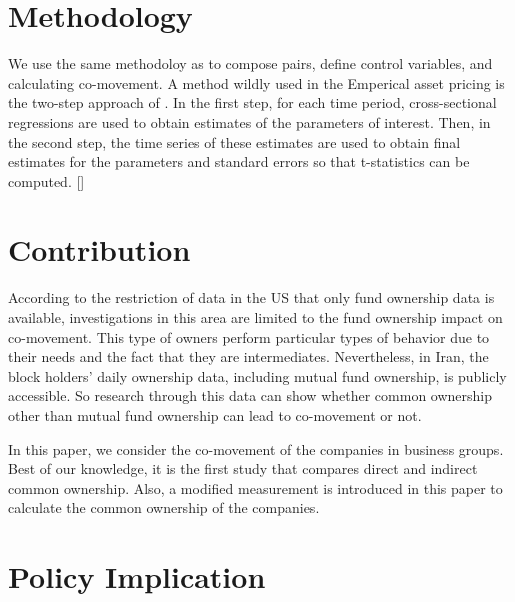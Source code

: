 \documentclass[12pt, a4paper]{article}
\begin{document}
\section*{Methodology}
We use the same methodoloy as  \cite{AntonPolk} to compose pairs, define control variables, and calculating co-movement. 
A method wildly used in the Emperical asset pricing is the two-step approach of \cite{FamaMacBeth}. In the first step, for each time period, cross-sectional regressions
are used to obtain estimates of the parameters of interest. Then, in the second step, the time series
of these estimates are used to obtain final estimates for the parameters and standard errors so that
t-statistics can be computed. [\cite{skoulakis2008panel}] 


\section*{Contribution}
According to the restriction of data in the US that only fund ownership data is available, investigations in this area are limited to the fund ownership impact on co-movement. This type of owners perform particular types of behavior due to their needs and the fact that they are intermediates.
	Nevertheless, in Iran, the block holders' daily ownership data, including mutual fund ownership, is publicly accessible. So research through this data can show whether common ownership other than mutual fund ownership can lead to co-movement or not.

	
		In this paper, we consider the co-movement of the companies in business groups. Best of our knowledge, it is the first study that compares direct and indirect common ownership. Also, a modified measurement is introduced in this paper to calculate the common ownership of the companies. 

\section*{Policy Implication}











	


	
\newpage
	{
	\footnotesize
	
	
}
\end{document}

